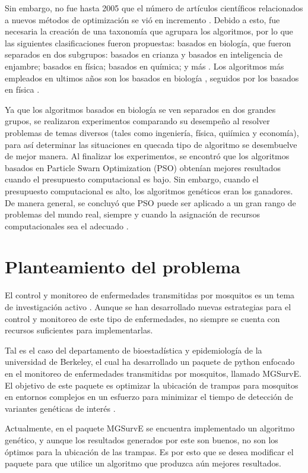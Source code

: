 \documentclass[letterpaper, 10pt, conference]{ieeeconf}
\begin{document}
Sin embargo, no fue hasta 2005 que el número de artículos científicos relacionados a nuevos métodos de optimización se vió en incremento \cite{Taxonomies}. Debido a esto, fue necesaria la creación de una taxonomía que agrupara los algoritmos, por lo que las siguientes clasificaciones fueron propuestas: basados en biología, que fueron separados en dos subgrupos: basados en crianza y basados en inteligencia de enjambre; basados en física; basados en química; y más \cite{Taxonomies}. Los algoritmos más empleados en ultimos años son los basados en biología \cite{Taxonomies}, seguidos por los basados en física \cite{PhysicsBasedRev}.

Ya que los algoritmos basados en biología se ven separados en dos grandes grupos, se realizaron experimentos comparando su desempeño al resolver problemas de temas diversos (tales como ingeniería, física, quiímica y economía), para así determinar las situaciones en quecada tipo de algoritmo se desembuelve de mejor manera. Al finalizar los experimentos, se encontró que los algoritmos basados en Particle Swarn Optimization (PSO) obtenían mejores resultados cuando el presupuesto computacional es bajo. Sin embargo, cuando el presupuesto computacional es alto, los algoritmos genéticos eran los ganadores. De manera general, se concluyó que PSO puede ser aplicado a un gran rango de problemas del mundo real, siempre y cuando la asignación de recursos computacionales sea el adecuado \cite{SwarmVsEvol}.

\section{Planteamiento del problema}
El control y monitoreo de enfermedades transmitidas por mosquitos es un tema de investigación activo \cite{AltStrategies}. Aunque se han desarrollado nuevas estrategias para el control y monitoreo de este tipo de enfermedades, no siempre se cuenta con recursos suficientes para implementarlas.

Tal es el caso del departamento de bioestadística y epidemiología de la universidad de Berkeley, el cual ha desarrollado un paquete de python enfocado en el monitoreo de enfermedades transmitidas por mosquitos, llamado MGSurvE. El objetivo de este paquete es optimizar la ubicación de trampas para mosquitos en entornos complejos en un esfuerzo para minimizar el tiempo de detección de variantes genéticas de interés \cite{MGSurvEPyPi}.

Actualmente, en el paquete MGSurvE se encuentra implementado un algoritmo genético, y aunque los resultados generados por este son buenos, no son los óptimos para la ubicación de las trampas. Es por esto que se desea modificar el paquete para que utilice un algoritmo que produzca aún mejores resultados. 
\end{document}
